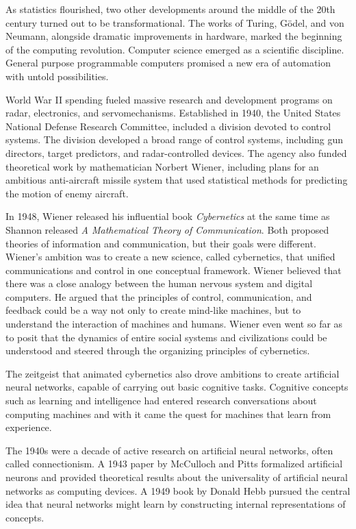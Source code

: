 \documentclass{tufte-book}
\begin{document}
As statistics flourished, two other developments around the middle of
the 20th century turned out to be transformational. The works of Turing,
Gödel, and von Neumann, alongside dramatic improvements in hardware,
marked the beginning of the computing revolution. Computer science
emerged as a scientific discipline. General purpose programmable
computers promised a new era of automation with untold possibilities.

World War II spending fueled massive research and development programs
on radar, electronics, and servomechanisms. Established in 1940, the
United States National Defense Research Committee, included a division
devoted to control systems. The division developed a broad range of
control systems, including gun directors, target predictors, and
radar-controlled devices. The agency also funded theoretical work by
mathematician Norbert Wiener, including plans for an ambitious
anti-aircraft missile system that used statistical methods for
predicting the motion of enemy aircraft.

In 1948, Wiener released his influential book \emph{Cybernetics} at the
same time as Shannon released \emph{A Mathematical Theory of
Communication}. Both proposed theories of information and communication,
but their goals were different. Wiener's ambition was to create a new
science, called cybernetics, that unified communications and control in
one conceptual framework. Wiener believed that there was a close analogy
between the human nervous system and digital computers. He argued that
the principles of control, communication, and feedback could be a way
not only to create mind-like machines, but to understand the interaction
of machines and humans. Wiener even went so far as to posit that the
dynamics of entire social systems and civilizations could be understood
and steered through the organizing principles of cybernetics.

The zeitgeist that animated cybernetics also drove ambitions to create
artificial neural networks, capable of carrying out basic cognitive
tasks. Cognitive concepts such as learning and intelligence had entered
research conversations about computing machines and with it came the
quest for machines that learn from experience.

The 1940s were a decade of active research on artificial neural
networks, often called connectionism. A 1943 paper by McCulloch and
Pitts formalized artificial neurons and provided theoretical results
about the universality of artificial neural networks as computing
devices. A 1949 book by Donald Hebb pursued the central idea that neural
networks might learn by constructing internal representations of
concepts.
\end{document}
